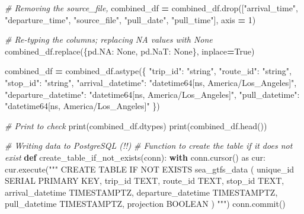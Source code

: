 \documentclass[
  12pt,
]{article}
\newenvironment{Shaded}{\begin{snugshade}}{\end{snugshade}}
\newcommand{\BuiltInTok}[1]{#1}
\newcommand{\CommentTok}[1]{\textcolor[rgb]{0.56,0.35,0.01}{\textit{#1}}}
\newcommand{\ControlFlowTok}[1]{\textcolor[rgb]{0.13,0.29,0.53}{\textbf{#1}}}
\newcommand{\DecValTok}[1]{\textcolor[rgb]{0.00,0.00,0.81}{#1}}
\newcommand{\ImportTok}[1]{#1}
\newcommand{\KeywordTok}[1]{\textcolor[rgb]{0.13,0.29,0.53}{\textbf{#1}}}
\newcommand{\NormalTok}[1]{#1}
\newcommand{\OperatorTok}[1]{\textcolor[rgb]{0.81,0.36,0.00}{\textbf{#1}}}
\newcommand{\StringTok}[1]{\textcolor[rgb]{0.31,0.60,0.02}{#1}}
\newcommand{\VariableTok}[1]{\textcolor[rgb]{0.00,0.00,0.00}{#1}}
\begin{document}
\begin{Shaded}
\begin{Highlighting}[]
\CommentTok{\# Removing the source\_file, }
\NormalTok{combined\_df }\OperatorTok{=}\NormalTok{ combined\_df.drop([}\StringTok{"arrival\_time"}\NormalTok{,}
                                \StringTok{"departure\_time"}\NormalTok{,}
                                \StringTok{"source\_file"}\NormalTok{,}
                                \StringTok{"pull\_date"}\NormalTok{,}
                                \StringTok{"pull\_time"}\NormalTok{],}
\NormalTok{                                axis }\OperatorTok{=} \DecValTok{1}\NormalTok{)}

\CommentTok{\# Re{-}typing the columns; replacing NA values with None}
\NormalTok{combined\_df.replace(\{pd.NA: }\VariableTok{None}\NormalTok{, pd.NaT: }\VariableTok{None}\NormalTok{\}, inplace}\OperatorTok{=}\VariableTok{True}\NormalTok{)}

\NormalTok{combined\_df }\OperatorTok{=}\NormalTok{ combined\_df.astype(\{}
    \StringTok{"trip\_id"}\NormalTok{: }\StringTok{"string"}\NormalTok{,}
    \StringTok{"route\_id"}\NormalTok{: }\StringTok{"string"}\NormalTok{,}
    \StringTok{"stop\_id"}\NormalTok{: }\StringTok{"string"}\NormalTok{,}
    \StringTok{"arrival\_datetime"}\NormalTok{: }\StringTok{"datetime64[ns, America/Los\_Angeles]"}\NormalTok{,}
    \StringTok{"departure\_datetime"}\NormalTok{: }\StringTok{"datetime64[ns, America/Los\_Angeles]"}\NormalTok{,}
    \StringTok{"pull\_datetime"}\NormalTok{: }\StringTok{"datetime64[ns, America/Los\_Angeles]"}
\NormalTok{\})}

\CommentTok{\# Print to check}
\BuiltInTok{print}\NormalTok{(combined\_df.dtypes)}
\BuiltInTok{print}\NormalTok{(combined\_df.head())}

\CommentTok{\# Writing data to PostgreSQL (!!)}
\CommentTok{\# Function to create the table if it does not exist}
\KeywordTok{def}\NormalTok{ create\_table\_if\_not\_exists(conn):}
    \ControlFlowTok{with}\NormalTok{ conn.cursor() }\ImportTok{as}\NormalTok{ cur:}
\NormalTok{        cur.execute(}\StringTok{"""}
\StringTok{            CREATE TABLE IF NOT EXISTS sea\_gtfs\_data (}
\StringTok{                unique\_id SERIAL PRIMARY KEY,}
\StringTok{                trip\_id TEXT,}
\StringTok{                route\_id TEXT,}
\StringTok{                stop\_id TEXT,}
\StringTok{                arrival\_datetime TIMESTAMPTZ,}
\StringTok{                departure\_datetime TIMESTAMPTZ,}
\StringTok{                pull\_datetime TIMESTAMPTZ,}
\StringTok{                projection BOOLEAN}
\StringTok{            )}
\StringTok{        """}\NormalTok{)}
\NormalTok{        conn.commit()}


\end{Highlighting}
\end{Shaded}
\end{document}
